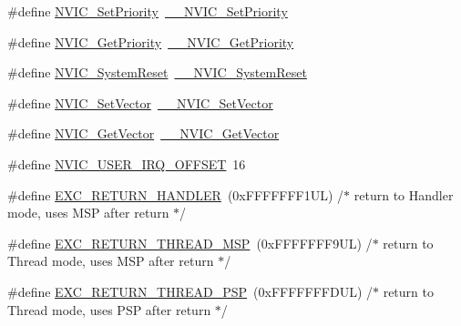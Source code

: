 \begin{DoxyCompactItemize}
\item 
\#define \hyperlink{group___c_m_s_i_s___core___n_v_i_c_functions_gae0e9d0e2f7b6133828c71b57d4941c35}{N\+V\+I\+C\+\_\+\+Set\+Priority}~\hyperlink{group___c_m_s_i_s___core___n_v_i_c_functions_ga505338e23563a9c074910fb14e7d45fd}{\+\_\+\+\_\+\+N\+V\+I\+C\+\_\+\+Set\+Priority}
\item 
\#define \hyperlink{group___c_m_s_i_s___core___n_v_i_c_functions_gaf59b9d0a791d2157abb319753953eceb}{N\+V\+I\+C\+\_\+\+Get\+Priority}~\hyperlink{group___c_m_s_i_s___core___n_v_i_c_functions_gaeb9dc99c8e7700668813144261b0bc73}{\+\_\+\+\_\+\+N\+V\+I\+C\+\_\+\+Get\+Priority}
\item 
\#define \hyperlink{group___c_m_s_i_s___core___n_v_i_c_functions_ga6aa0367d3642575610476bf0366f0c48}{N\+V\+I\+C\+\_\+\+System\+Reset}~\hyperlink{group___c_m_s_i_s___core___n_v_i_c_functions_ga0d9aa2d30fa54b41eb780c16e35b676c}{\+\_\+\+\_\+\+N\+V\+I\+C\+\_\+\+System\+Reset}
\item 
\#define \hyperlink{group___c_m_s_i_s___core___n_v_i_c_functions_ga804af63bb4c4c317387897431814775d}{N\+V\+I\+C\+\_\+\+Set\+Vector}~\hyperlink{group___c_m_s_i_s___core___n_v_i_c_functions_ga0df355460bc1783d58f9d72ee4884208}{\+\_\+\+\_\+\+N\+V\+I\+C\+\_\+\+Set\+Vector}
\item 
\#define \hyperlink{group___c_m_s_i_s___core___n_v_i_c_functions_ga955eb1c33a3dcc62af11a8385e8c0fc8}{N\+V\+I\+C\+\_\+\+Get\+Vector}~\hyperlink{group___c_m_s_i_s___core___n_v_i_c_functions_ga44b665d2afb708121d9b10c76ff00ee5}{\+\_\+\+\_\+\+N\+V\+I\+C\+\_\+\+Get\+Vector}
\item 
\#define \hyperlink{group___c_m_s_i_s___core___n_v_i_c_functions_ga8045d905a5ca57437d8e6f71ffcb6df5}{N\+V\+I\+C\+\_\+\+U\+S\+E\+R\+\_\+\+I\+R\+Q\+\_\+\+O\+F\+F\+S\+ET}~16
\item 
\#define \hyperlink{group___c_m_s_i_s___core___n_v_i_c_functions_gaa6fa2b10f756385433e08522d9e4632f}{E\+X\+C\+\_\+\+R\+E\+T\+U\+R\+N\+\_\+\+H\+A\+N\+D\+L\+ER}~(0x\+F\+F\+F\+F\+F\+F\+F1\+U\+L)     /$\ast$ return to Handler mode, uses M\+S\+P after return                               $\ast$/
\item 
\#define \hyperlink{group___c_m_s_i_s___core___n_v_i_c_functions_gaea4703101b5e679f695e231f7ee72331}{E\+X\+C\+\_\+\+R\+E\+T\+U\+R\+N\+\_\+\+T\+H\+R\+E\+A\+D\+\_\+\+M\+SP}~(0x\+F\+F\+F\+F\+F\+F\+F9\+U\+L)     /$\ast$ return to Thread mode, uses M\+S\+P after return                                $\ast$/
\item 
\#define \hyperlink{group___c_m_s_i_s___core___n_v_i_c_functions_ga9998daf0fbdf31dbc8f81cd604b58175}{E\+X\+C\+\_\+\+R\+E\+T\+U\+R\+N\+\_\+\+T\+H\+R\+E\+A\+D\+\_\+\+P\+SP}~(0x\+F\+F\+F\+F\+F\+F\+F\+D\+U\+L)     /$\ast$ return to Thread mode, uses P\+S\+P after return                                $\ast$/

\end{DoxyCompactItemize}
